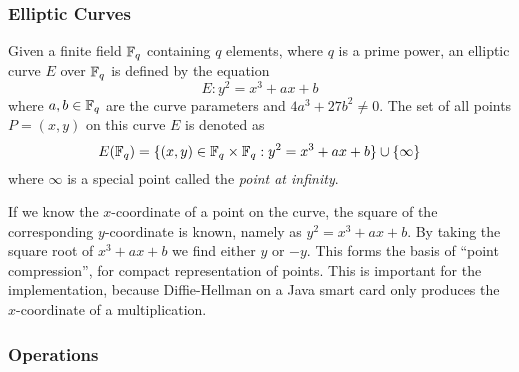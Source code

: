\subsubsection{Elliptic Curves}

\begin{definition}\label{def:elliptic_curve}
  Given a finite field $\mathbb{F}_{q}$ containing $q$ elements, where $q$ is a prime
  power, an elliptic curve $E$ over $\mathbb{F}_{q}$ is defined by the equation
  \begin{equation}\label{eqn:elliptic_curve}
    E: y^2 = x^3 + a x + b
  \end{equation}
  where $a, b \in \mathbb{F}_{q}$ are the curve parameters and $4 a^3 + 27 b^2 \neq 0$.
  The set of all points $P = (x, y)$ on this curve $E$ is denoted as
  \begin{equation*}
    E(\mathbb{F}_{q}) = \{ (x, y) \in \mathbb{F}_{q} \times \mathbb{F}_{q} : y^2 = x^3 + a x + b \}
                         \cup \{ \infty \}
  \end{equation*}
  where $\infty$ is a special point called the \emph{point at infinity}.
\end{definition}

If we know the $x$-coordinate of a point on the curve, the square of the
corresponding $y$-coordinate is known, namely as $y^{2} = x^{3} + ax + b$.
By taking the square root of $x^{3} + ax + b$ we find either $y$ or $-y$.
This forms the basis of ``point compression'', for compact representation
of points.  This is important for the implementation, because Diffie-Hellman
on a Java smart card only produces the $x$-coordinate of a multiplication.

\subsubsection{Operations}

